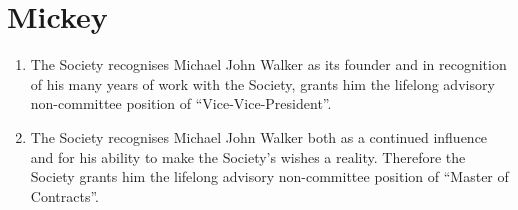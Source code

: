 \documentclass[a4paper,10pt]{article}
\begin{document}
\section{Mickey}
\begin{enumerate}
  \item The Society recognises Michael John Walker as its founder and in recognition of his many years of work with the Society, grants him the lifelong advisory non-committee position of “Vice-Vice-President”.
  \item The Society recognises Michael John Walker both as a continued influence and for his ability to make the Society's wishes a reality. Therefore the Society grants him the lifelong advisory non-committee position of ``Master of Contracts''.
\end{enumerate}
\end{document}
